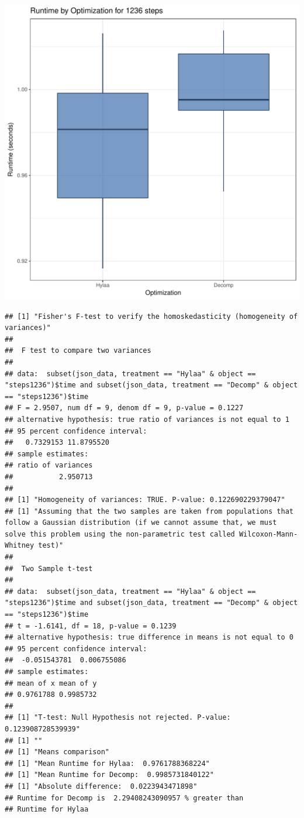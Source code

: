 \documentclass{article}\usepackage[]{graphicx}\usepackage[]{color}
\makeatletter
\def\maxwidth{ %
  \ifdim\Gin@nat@width>\linewidth
    \linewidth
  \else
    \Gin@nat@width
  \fi
}
\newenvironment{kframe}{%
 \def\at@end@of@kframe{}%
 \ifinner\ifhmode%
  \def\at@end@of@kframe{\end{minipage}}%
  \begin{minipage}{\columnwidth}%
 \fi\fi%
 \def\FrameCommand##1{\hskip\@totalleftmargin \hskip-\fboxsep
 \colorbox{shadecolor}{##1}\hskip-\fboxsep
     \hskip-\linewidth \hskip-\@totalleftmargin \hskip\columnwidth}%
 \MakeFramed {\advance\hsize-\width
   \@totalleftmargin\z@ \linewidth\hsize
   \@setminipage}}%
 {\par\unskip\endMakeFramed%
 \at@end@of@kframe}
\newenvironment{knitrout}{}{} %
\makeatother
\begin{document}
\begin{knitrout}
\color{fgcolor}
\includegraphics[width=\maxwidth]{figure/RH2_steps1236-1} 
\begin{kframe}\begin{verbatim}
## [1] "Fisher's F-test to verify the homoskedasticity (homogeneity of variances)"
## 
## 	F test to compare two variances
## 
## data:  subset(json_data, treatment == "Hylaa" & object == "steps1236")$time and subset(json_data, treatment == "Decomp" & object == "steps1236")$time
## F = 2.9507, num df = 9, denom df = 9, p-value = 0.1227
## alternative hypothesis: true ratio of variances is not equal to 1
## 95 percent confidence interval:
##   0.7329153 11.8795520
## sample estimates:
## ratio of variances 
##           2.950713 
## 
## [1] "Homogeneity of variances: TRUE. P-value: 0.122690229379047"
## [1] "Assuming that the two samples are taken from populations that follow a Gaussian distribution (if we cannot assume that, we must solve this problem using the non-parametric test called Wilcoxon-Mann-Whitney test)"
## 
## 	Two Sample t-test
## 
## data:  subset(json_data, treatment == "Hylaa" & object == "steps1236")$time and subset(json_data, treatment == "Decomp" & object == "steps1236")$time
## t = -1.6141, df = 18, p-value = 0.1239
## alternative hypothesis: true difference in means is not equal to 0
## 95 percent confidence interval:
##  -0.051543781  0.006755086
## sample estimates:
## mean of x mean of y 
## 0.9761788 0.9985732 
## 
## [1] "T-test: Null Hypothesis not rejected. P-value: 0.123908728539939"
## [1] ""
## [1] "Means comparison"
## [1] "Mean Runtime for Hylaa:  0.9761788368224"
## [1] "Mean Runtime for Decomp:  0.9985731840122"
## [1] "Absolute difference:  0.0223943471898"
## Runtime for Decomp is  2.29408243090957 % greater than 
## Runtime for Hylaa
\end{verbatim}
\end{kframe}
\end{knitrout}
\end{document}
